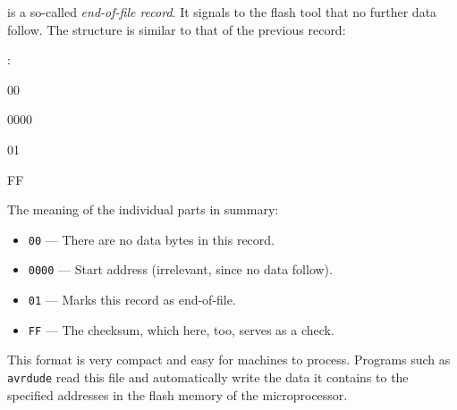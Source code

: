 \documentclass[a4paper,12pt]{article}
\begin{document}
is a so-called \emph{end-of-file record}. It signals to the flash tool that
no further data follow. The structure is similar to that of the previous
record:

\begin{center}
\begin{minipage}{\textwidth}
\ttfamily
\colorbox{gray!20}{\strut\textcolor{black}{:}}%
\colorbox{myblue!20}{\strut00}%
\colorbox{cyan!20}{\strut0000}%
\colorbox{violet!20}{\strut01}%
\colorbox{red!20}{\strut FF}
\par\vspace{0.1cm}\null

\vspace{0.2cm}

\hspace{1cm}%
\end{minipage}
\end{center}

\noindent
The meaning of the individual parts in summary:

\begin{itemize}
  \item \texttt{00} — There are no data bytes in this record.
  \item \texttt{0000} — Start address (irrelevant, since no data follow).
  \item \texttt{01} — Marks this record as end-of-file.
  \item \texttt{FF} — The checksum, which here, too, serves as a check.
\end{itemize}

\noindent
This format is very compact and easy for machines to process.
Programs such as \texttt{avrdude} read this file and automatically write the
data it contains to the specified addresses in the flash memory of the
microprocessor.
\end{document}
